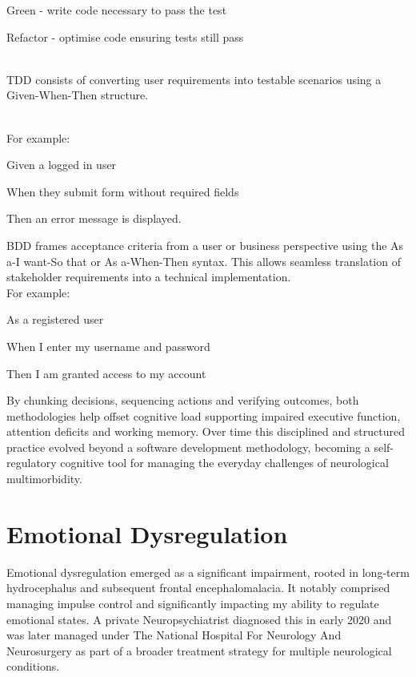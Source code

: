 \documentclass{article}
\begin{document}
Green - write code necessary to pass the test

Refactor - optimise code ensuring tests still pass

\noindent\\TDD consists of converting user requirements into testable scenarios using a Given-When-Then structure.

\noindent
\\
For example:
\\
\par
Given a logged in user

When they submit form without required fields

Then an error message is displayed.
\\
\par
BDD frames acceptance criteria from a user or business perspective using the As a-I want-So that or As a-When-Then syntax. This allows seamless translation of stakeholder requirements into a technical implementation.\cite{north2006,chelimsky2010}
\noindent
\\
For example:
\\
\par
As a registered user

When I enter my username and password

Then I am granted access to my account
\\
\par
By chunking decisions, sequencing actions and verifying outcomes, both methodologies help offset cognitive load supporting impaired executive function, attention deficits and working memory. Over time this disciplined and structured practice evolved beyond a software development methodology, becoming a self-regulatory cognitive tool for managing the everyday challenges of neurological multimorbidity.\cite{zimmerman2000}

\section*{Emotional Dysregulation}
Emotional dysregulation emerged as a significant impairment, rooted in long-term hydrocephalus and subsequent frontal encephalomalacia. It notably comprised managing impulse control and significantly impacting my ability to regulate emotional states. A private Neuropsychiatrist diagnosed this in early 2020 and was later managed under The National Hospital For Neurology And Neurosurgery as part of a broader treatment strategy for multiple neurological conditions.
\end{document}
